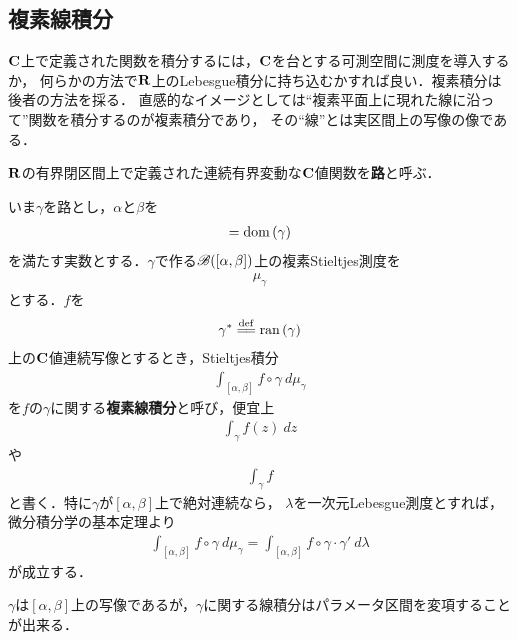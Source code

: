 \subsection{複素線積分}
	
	$\mathbf{C}$上で定義された関数を積分するには，$\mathbf{C}$を台とする可測空間に測度を導入するか，
	何らかの方法で$\mathbf{R}$上のLebesgue積分に持ち込むかすれば良い．複素積分は後者の方法を採る．
	直感的なイメージとしては``複素平面上に現れた線に沿って''関数を積分するのが複素積分であり，
	その``線''とは実区間上の写像の像である．
	
	\begin{screen}
		\begin{dfn}[路]
			$\mathbf{R}$の有界閉区間上で定義された連続有界変動な$\mathbf{C}$値関数を{\bf 路}と呼ぶ．
		\end{dfn}
	\end{screen}
	
	いま$\gamma$を路とし，$\alpha$と$\beta$を
	\begin{align}
		[\alpha,\beta] = \dom{\gamma}
	\end{align}
	を満たす実数とする．$\gamma$で作る$\mathscr{B}([\alpha,\beta])$上の複素Stieltjes測度を
	\begin{align}
		\mu_{\gamma}
	\end{align}
	とする．$f$を
	\begin{align}
		\gamma^* \defeq \ran{\gamma}
	\end{align}
	上の$\mathbf{C}$値連続写像とするとき，Stieltjes積分
	\begin{align}
		\int_{[\alpha,\beta]} f \circ \gamma\ d\mu_{\gamma}
	\end{align}
	を$f$の$\gamma$に関する{\bf 複素線積分}と呼び，便宜上
	\begin{align}
		\int_{\gamma} f(z)\ dz
	\end{align}
	や
	\begin{align}
		\int_{\gamma} f
	\end{align}
	と書く．特に$\gamma$が$[\alpha,\beta]$上で絶対連続なら，
	$\lambda$を一次元Lebesgue測度とすれば，微分積分学の基本定理より
	\begin{align}
		\int_{[\alpha,\beta]} f \circ \gamma\ d\mu_\gamma = \int_{[\alpha,\beta]}f \circ \gamma \cdot \gamma'\ d\lambda
	\end{align}
	が成立する．
	
	$\gamma$は$[\alpha,\beta]$上の写像であるが，$\gamma$に関する線積分はパラメータ区間を変項することが出来る．
	
